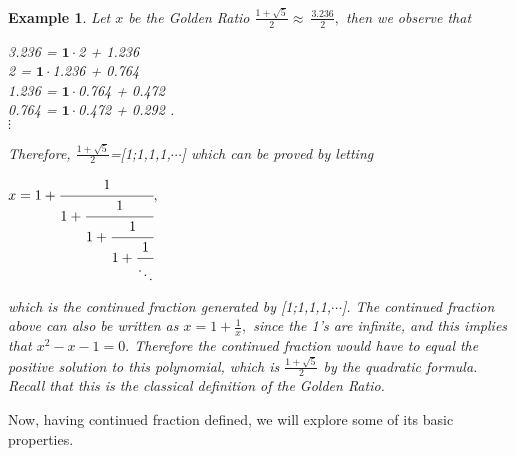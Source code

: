 \documentclass[11pt]{amsart}
\theoremstyle{plain}
\newtheorem{exa}{Example}
\theoremstyle{definition}
\begin{document}
\begin{exa}
Let $x$ be the Golden Ratio $\frac{1+\sqrt{5}}{2}\approx\:\frac{3.236}{2}, $ then we observe that
\begin{center}
3.236 = $\mathbf{1}\cdot$2 + 1.236\\
2 = $\mathbf{1}\cdot$1.236 + 0.764\\
1.236 = $\mathbf{1}\cdot$0.764 + 0.472\\
0.764 = $\mathbf{1}\cdot$0.472 + 0.292 .\\
$\vdots$
\end{center}

Therefore, $\frac{1+\sqrt{5}}{2}$=[1;1,1,1,$\cdots$] which can be proved by letting

\begin{center}
 $ x = 1 + \cfrac{1}{1
          + \cfrac{1}{1
          + \cfrac{1}{1 + \cfrac{1}{\ddots} } } },$
\end{center}
which is the continued fraction generated by [1;1,1,1,$\cdots$].
The continued fraction above can also be written as 
$x = 1 + \frac{1}{x} , $ since the 1's are infinite, and this implies that $ x^2 - x - 1 = 0 . $  
Therefore the continued fraction would have to equal the positive solution to this polynomial, which is $\frac{1+\sqrt{5}}{2}$ by the quadratic formula.  Recall that this is the classical definition of the Golden Ratio.
\end{exa}

\medskip

Now, having continued fraction defined, we will explore some of its basic properties.
\medskip
\end{document}

